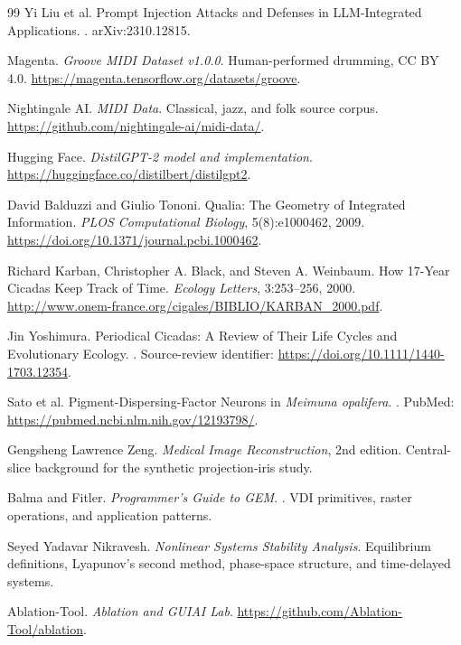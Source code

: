 \begin{thebibliography}{99}
Yi Liu et al.
\newblock Prompt Injection Attacks and Defenses in LLM-Integrated Applications.
. arXiv:2310.12815.

Magenta.
\newblock \emph{Groove MIDI Dataset v1.0.0}.
\newblock Human-performed drumming, CC BY 4.0.
\newblock \url{https://magenta.tensorflow.org/datasets/groove}.

Nightingale AI.
\newblock \emph{MIDI Data}.
\newblock Classical, jazz, and folk source corpus.
\newblock \url{https://github.com/nightingale-ai/midi-data/}.

Hugging Face.
\newblock \emph{DistilGPT-2 model and implementation}.
\newblock \url{https://huggingface.co/distilbert/distilgpt2}.

David Balduzzi and Giulio Tononi.
\newblock Qualia: The Geometry of Integrated Information.
\newblock \emph{PLOS Computational Biology}, 5(8):e1000462, 2009.
\newblock \url{https://doi.org/10.1371/journal.pcbi.1000462}.

Richard Karban, Christopher A. Black, and Steven A. Weinbaum.
\newblock How 17-Year Cicadas Keep Track of Time.
\newblock \emph{Ecology Letters}, 3:253--256, 2000.
\newblock \url{http://www.onem-france.org/cigales/BIBLIO/KARBAN_2000.pdf}.

Jin Yoshimura.
\newblock Periodical Cicadas: A Review of Their Life Cycles and Evolutionary Ecology.
. Source-review identifier: \url{https://doi.org/10.1111/1440-1703.12354}.

Sato et al.
\newblock Pigment-Dispersing-Factor Neurons in \emph{Meimuna opalifera}.
. PubMed: \url{https://pubmed.ncbi.nlm.nih.gov/12193798/}.

Gengsheng Lawrence Zeng.
\newblock \emph{Medical Image Reconstruction}, 2nd edition.
\newblock Central-slice background for the synthetic projection-iris study.

Balma and Fitler.
\newblock \emph{Programmer's Guide to GEM}.
. VDI primitives, raster operations, and application patterns.

Seyed Yadavar Nikravesh.
\newblock \emph{Nonlinear Systems Stability Analysis}.
\newblock Equilibrium definitions, Lyapunov's second method, phase-space structure, and time-delayed systems.

Ablation-Tool.
\newblock \emph{Ablation and GUIAI Lab}.
\newblock \url{https://github.com/Ablation-Tool/ablation}.


\end{thebibliography}
